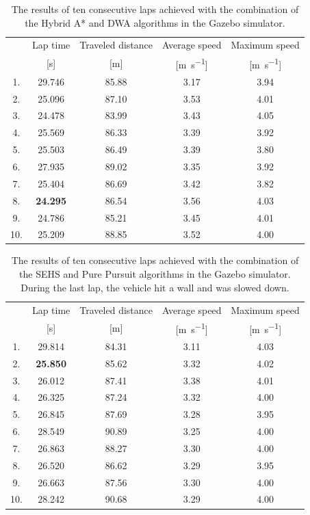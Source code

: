 \begin{table}
	\centering
	\begin{tabular}{c c c c c}
		\toprule
		& Lap time       & Traveled distance  & Average speed             & Maximum speed             \\
		& [\si{\second}] & [\si{\meter}]      & [\si{\meter\per\second}]  & [\si{\meter\per\second}]  \\
		\midrule
		1. & 29.746 & 85.88 & 3.17 &  3.94 \\
		2. & 25.096 & 87.10 & 3.53 &  4.01 \\
		3. & 24.478 & 83.99 & 3.43 &  4.05 \\
		4. & 25.569 & 86.33 & 3.39 &  3.92 \\
		5. & 25.503 & 86.49 & 3.39 &  3.80 \\
		6. & 27.935 & 89.02 & 3.35 &  3.92 \\
		7. & 25.404 & 86.69 & 3.42 &  3.82 \\
		8. & \bfseries 24.295 & 86.54 & 3.56 &  4.03 \\
		9. & 24.786 & 85.21 & 3.45 &  4.01 \\
		10. & 25.209 & 88.85 & 3.52 &  4.00 \\
		\bottomrule
	\end{tabular}
	\caption{The results of ten consecutive laps achieved with the combination of the Hybrid A* and DWA algorithms in the Gazebo simulator.}
	\label{tbl:dwa-hybrid-astar}
\end{table}

\begin{table}
	\centering
	\begin{tabular}{c c c c c}
		\toprule
		& Lap time & Traveled distance  & Average speed & Maximum speed             \\
		& [\si{\second}] & [\si{\meter}]      & [\si{\meter\per\second}]  & [\si{\meter\per\second}]  \\
		\midrule
		1. & 29.814 & 84.31 & 3.11 & 4.03 \\
		2. & \bfseries 25.850 & 85.62 & 3.32 & 4.02 \\
		3. & 26.012 & 87.41 & 3.38 & 4.01 \\
		4. & 26.325 & 87.24 & 3.32 & 4.00 \\
		5. & 26.845 & 87.69 & 3.28 & 3.95 \\
		6. & 28.549 & 90.89 & 3.25 & 4.00 \\
		7. & 26.863 & 88.27 & 3.30 & 4.00 \\
		8. & 26.520 & 86.62 & 3.29 & 3.95 \\
		9. & 26.663 & 87.56 & 3.30 & 4.00 \\
		10. & 28.242 & 90.68 & 3.29 & 4.00 \\
		\bottomrule
	\end{tabular}
	\caption{The results of ten consecutive laps achieved with the combination of the SEHS and Pure Pursuit algorithms in the Gazebo simulator. During the last lap, the vehicle hit a wall and was slowed down.}
	\label{tbl:pure-pursuit-sehs}
\end{table}

